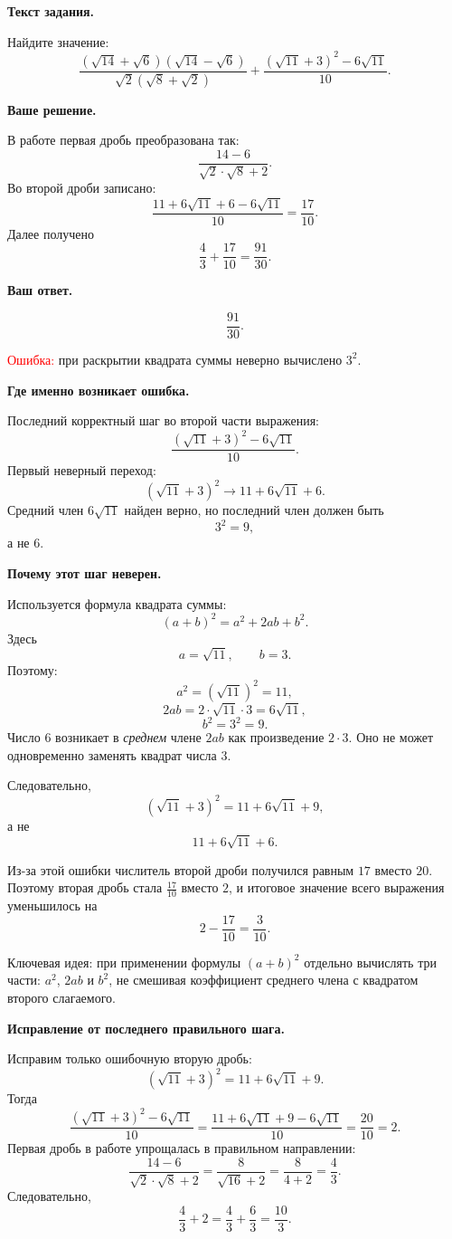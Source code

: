 \documentclass[12pt,a4paper]{article}
\begin{document}
\textbf{Текст задания.}

Найдите значение:
\[
\frac{(\sqrt{14}+\sqrt6)(\sqrt{14}-\sqrt6)}
{\sqrt2(\sqrt8+\sqrt2)}
+
\frac{(\sqrt{11}+3)^2-6\sqrt{11}}{10}.
\]

\textbf{Ваше решение.}

В работе первая дробь преобразована так:
\[
\frac{14-6}{\sqrt2\cdot\sqrt8+2}.
\]
Во второй дроби записано:
\[
\frac{11+6\sqrt{11}+6-6\sqrt{11}}{10}
=
\frac{17}{10}.
\]
Далее получено
\[
\frac43+\frac{17}{10}
=
\frac{91}{30}.
\]

\textbf{Ваш ответ.}

\[
\frac{91}{30}.
\]

\textcolor{red}{Ошибка:} при раскрытии квадрата суммы неверно вычислено $3^2$.

\textbf{Где именно возникает ошибка.}

Последний корректный шаг во второй части выражения:
\[
\frac{(\sqrt{11}+3)^2-6\sqrt{11}}{10}.
\]
Первый неверный переход:
\[
(\sqrt{11}+3)^2
\longrightarrow
11+6\sqrt{11}+6.
\]
Средний член $6\sqrt{11}$ найден верно, но последний член должен быть
\[
3^2=9,
\]
а не $6$.

\textbf{Почему этот шаг неверен.}

Используется формула квадрата суммы:
\[
(a+b)^2=a^2+2ab+b^2.
\]
Здесь
\[
a=\sqrt{11},
\qquad
b=3.
\]
Поэтому:
\[
a^2=(\sqrt{11})^2=11,
\]
\[
2ab=2\cdot\sqrt{11}\cdot3=6\sqrt{11},
\]
\[
b^2=3^2=9.
\]
Число $6$ возникает в \emph{среднем} члене $2ab$ как произведение $2\cdot3$. Оно не может одновременно заменять квадрат числа $3$.

Следовательно,
\[
(\sqrt{11}+3)^2
=
11+6\sqrt{11}+9,
\]
а не
\[
11+6\sqrt{11}+6.
\]

Из-за этой ошибки числитель второй дроби получился равным $17$ вместо $20$. Поэтому вторая дробь стала $\frac{17}{10}$ вместо $2$, и итоговое значение всего выражения уменьшилось на
\[
2-\frac{17}{10}=\frac3{10}.
\]

\textcolor{blue!60!black}{Ключевая идея:} при применении формулы $(a+b)^2$ отдельно вычислять три части: $a^2$, $2ab$ и $b^2$, не смешивая коэффициент среднего члена с квадратом второго слагаемого.

\textbf{Исправление от последнего правильного шага.}

Исправим только ошибочную вторую дробь:
\[
(\sqrt{11}+3)^2
=
11+6\sqrt{11}+9.
\]
Тогда
\[
\frac{(\sqrt{11}+3)^2-6\sqrt{11}}{10}
=
\frac{11+6\sqrt{11}+9-6\sqrt{11}}{10}
=
\frac{20}{10}
=
2.
\]
Первая дробь в работе упрощалась в правильном направлении:
\[
\frac{14-6}{\sqrt2\cdot\sqrt8+2}
=
\frac8{\sqrt{16}+2}
=
\frac8{4+2}
=
\frac43.
\]
Следовательно,
\[
\frac43+2
=
\frac43+\frac63
=
\frac{10}{3}.
\]
\end{document}
